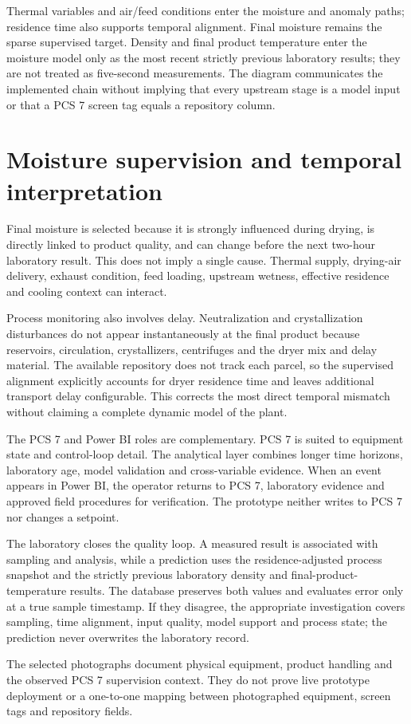 \FloatBarrier

Thermal variables and air/feed conditions enter the moisture and anomaly paths; residence time also supports temporal alignment. Final moisture remains the sparse supervised target. Density and final product temperature enter the moisture model only as the most recent strictly previous laboratory results; they are not treated as five-second measurements. The diagram communicates the implemented chain without implying that every upstream stage is a model input or that a PCS 7 screen tag equals a repository column.

\newpage

\section{Moisture supervision and temporal interpretation}

Final moisture is selected because it is strongly influenced during drying, is directly linked to product quality, and can change before the next two-hour laboratory result. This does not imply a single cause. Thermal supply, drying-air delivery, exhaust condition, feed loading, upstream wetness, effective residence and cooling context can interact.

Process monitoring also involves delay. Neutralization and crystallization disturbances do not appear instantaneously at the final product because reservoirs, circulation, crystallizers, centrifuges and the dryer mix and delay material. The available repository does not track each parcel, so the supervised alignment explicitly accounts for dryer residence time and leaves additional transport delay configurable. This corrects the most direct temporal mismatch without claiming a complete dynamic model of the plant.

The PCS 7 and Power BI roles are complementary. PCS 7 is suited to equipment state and control-loop detail. The analytical layer combines longer time horizons, laboratory age, model validation and cross-variable evidence. When an event appears in Power BI, the operator returns to PCS 7, laboratory evidence and approved field procedures for verification. The prototype neither writes to PCS 7 nor changes a setpoint.

The laboratory closes the quality loop. A measured result is associated with sampling and analysis, while a prediction uses the residence-adjusted process snapshot and the strictly previous laboratory density and final-product-temperature results. The database preserves both values and evaluates error only at a true sample timestamp. If they disagree, the appropriate investigation covers sampling, time alignment, input quality, model support and process state; the prediction never overwrites the laboratory record.

\begin{limitbox}
The selected photographs document physical equipment, product handling and the observed PCS 7 supervision context. They do not prove live prototype deployment or a one-to-one mapping between photographed equipment, screen tags and repository fields.
\end{limitbox}
